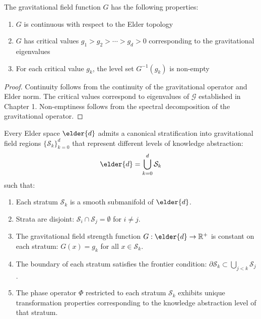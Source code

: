 \begin{proposition}
The gravitational field function $G$ has the following properties:
\begin{enumerate}
    \item $G$ is continuous with respect to the Elder topology
    \item $G$ has critical values $g_1 > g_2 > \cdots > g_d > 0$ corresponding to the gravitational eigenvalues
    \item For each critical value $g_k$, the level set $G^{-1}(g_k)$ is non-empty
\end{enumerate}
\end{proposition}

\begin{proof}
Continuity follows from the continuity of the gravitational operator and Elder norm. The critical values correspond to eigenvalues of $\mathcal{G}$ established in Chapter 1. Non-emptiness follows from the spectral decomposition of the gravitational operator.
\end{proof}

\begin{theorem}
Every Elder space $\elder{d}$ admits a canonical stratification into gravitational field regions $\{\mathcal{S}_k\}_{k=0}^{d}$ that represent different levels of knowledge abstraction:
\begin{equation}
\elder{d} = \bigcup_{k=0}^{d} \mathcal{S}_k
\end{equation}
such that:
\begin{enumerate}
    \item Each stratum $\mathcal{S}_k$ is a smooth submanifold of $\elder{d}$.
    
    \item Strata are disjoint: $\mathcal{S}_i \cap \mathcal{S}_j = \emptyset$ for $i \neq j$.
    
    \item The gravitational field strength function $G: \elder{d} \rightarrow \mathbb{R}^+$ is constant on each stratum: $G(x) = g_k$ for all $x \in \mathcal{S}_k$.
    
    \item The boundary of each stratum satisfies the frontier condition: $\partial \mathcal{S}_k \subset \bigcup_{j < k} \mathcal{S}_j$.
    
    \item The phase operator $\Phi$ restricted to each stratum $\mathcal{S}_k$ exhibits unique transformation properties corresponding to the knowledge abstraction level of that stratum.
\end{enumerate}
\end{theorem}

